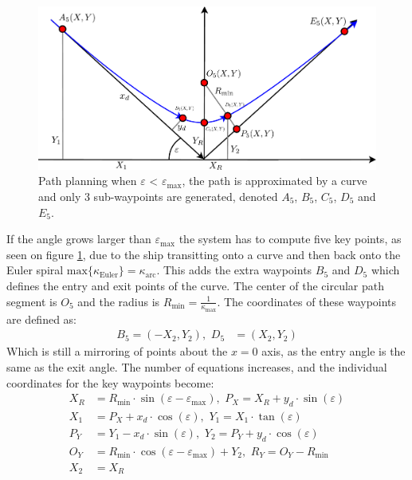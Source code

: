 \documentclass[a0,portrait]{a0poster}
\begin{document}
\begin{center}
{\paragraph{}
\begin{figure}
	\begin{center}
		\includegraphics[width=\threecolwidth]{img/5Points}    %
		\caption{Path planning when $\varepsilon$ < $\varepsilon_\text{max}$, the path is approximated by a curve and only 3 sub-waypoints are generated, denoted $A_5$, $B_5$, $C_5$, $D_5$ and $E_5$.}  %
		\label{fig:5points}               
	\end{center}                                 %
\end{figure}

If the angle grows larger than $\varepsilon_\text{max}$ the system has to compute five key points, as seen on figure \ref{fig:5points}, due to the ship transitting onto a curve and then back onto the Euler spiral $\text{max}\{\kappa_\text{Euler}\} = \kappa_\text{arc}$. This adds the extra waypoints $B_5$ and $D_5$ which defines the entry and exit points of the curve. The center of the circular path segment is $O_5$ and the radius is $R_\text{min} = \frac{1}{\kappa_\text{max}}$. The coordinates of these waypoints are defined as:
\begin{align}
B_5 = (-X_2,Y_2),\,\, D_5 &= (X_2,Y_2)
\end{align}
Which is still a mirroring of points about the $x=0$ axis, as the entry angle is the same as the exit angle. The number of equations increases, and the individual coordinates for the key waypoints become:
\begin{align}
X_R &= R_\text{min} \cdot \sin(\varepsilon - \varepsilon _\text{max}),\,\, P_X = X_R + y_d \cdot \sin(\varepsilon)\\
X_1 &= P_X + x_d \cdot \cos(\varepsilon),\,\, Y_1 = X_1 \cdot \tan(\varepsilon)\\
P_Y &= Y_1 - x_d \cdot \sin(\varepsilon),\,\, Y_2 = P_Y + y_d \cdot \cos(\varepsilon)\\
O_Y &= R_\text{min} \cdot \cos(\varepsilon - \varepsilon _\text{max}) + Y_2,\,\, R_Y = O_Y - R_\text{min}\\
X_2 &= X_R
\end{align}

}
\end{center}
\end{document}
